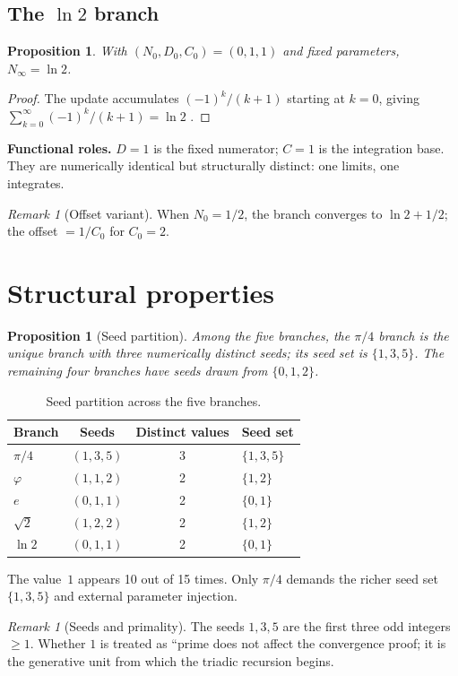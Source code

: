 \documentclass[12pt]{article}
\newtheorem{proposition}[theorem]{Proposition}
\theoremstyle{definition}
\theoremstyle{remark}
\newtheorem{remark}[theorem]{Remark}
\begin{document}
\subsection{The \texorpdfstring{$\ln 2$}{ln 2} branch}\label{subsec:ln2}

\begin{proposition}\label{prop:ln2}
With $(N_0, D_0, C_0) = (0, 1, 1)$ and fixed parameters, $N_\infty = \ln 2$.
\end{proposition}
\begin{proof}
The update accumulates $(-1)^k/(k+1)$ starting at $k = 0$, giving
$\sum_{k=0}^\infty (-1)^k/(k+1) = \ln 2$ \cite{Kno56}.
\end{proof}
\textbf{Functional roles.} $D = 1$ is the fixed numerator; $C = 1$ is the integration base.
They are numerically identical but structurally distinct: one limits, one integrates.
\begin{remark}[Offset variant]
When $N_0 = 1/2$, the branch converges to $\ln 2 + 1/2$; the offset $= 1/C_0$ for $C_0 = 2$.
\end{remark}

\section{Structural properties}\label{sec:structural}

\begin{proposition}[Seed partition]\label{prop:seed-partition}
Among the five branches, the $\pi/4$ branch is the unique branch with three numerically
distinct seeds; its seed set is $\{1, 3, 5\}$. The remaining four branches have seeds
drawn from $\{0, 1, 2\}$.
\end{proposition}
\begin{table}[ht]
\centering\caption{Seed partition across the five branches.}\label{tab:seed-partition}
\begin{tabular}{lccl}\toprule
Branch & Seeds & Distinct values & Seed set \\\midrule
$\pi/4$    & $(1,3,5)$ & 3 & $\{1,3,5\}$ \\
$\varphi$  & $(1,1,2)$ & 2 & $\{1,2\}$ \\
$e$        & $(0,1,1)$ & 2 & $\{0,1\}$ \\
$\sqrt{2}$ & $(1,2,2)$ & 2 & $\{1,2\}$ \\
$\ln 2$    & $(0,1,1)$ & 2 & $\{0,1\}$ \\\bottomrule
\end{tabular}\end{table}
The value~$1$ appears 10 out of 15 times. Only $\pi/4$ demands the richer seed set
$\{1, 3, 5\}$ and external parameter injection.
\begin{remark}[Seeds and primality]
The seeds $1, 3, 5$ are the first three odd integers $\geq 1$. Whether $1$ is treated
as ``prime does not affect the convergence proof; it is the generative unit from
which the triadic recursion begins.
\end{remark}
\end{document}

